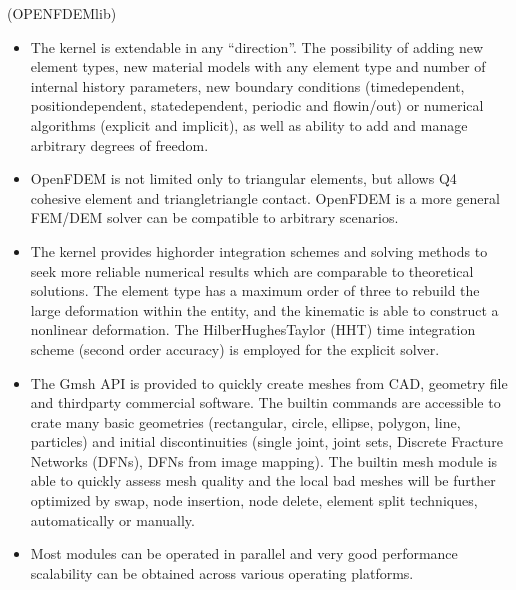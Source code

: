 \documentclass[letterpaper,10pt,english]{sphinxmanual}
\begin{document}
 (OPENFDEMlib)
\begin{itemize}
\item {} 
 \sphinxhyphen{} The kernel is extendable in any “direction”. The possibility of adding new element types, new material models with any element type and number of internal history parameters, new boundary conditions (time\sphinxhyphen{}dependent, position\sphinxhyphen{}dependent, state\sphinxhyphen{}dependent, periodic and flow\sphinxhyphen{}in/out) or numerical algorithms (explicit and implicit), as well as ability to add and manage arbitrary degrees of freedom.

\item {} 
 \sphinxhyphen{} OpenFDEM is not limited only to triangular elements, but allows Q4 cohesive element and triangle\sphinxhyphen{}triangle contact. OpenFDEM is a more general FEM/DEM solver can be compatible to arbitrary scenarios.

\item {} 
 \textendash{} The kernel provides high\sphinxhyphen{}order integration schemes and solving methods to seek more reliable numerical results which are comparable to theoretical solutions. The element type has a maximum order of three to rebuild the large deformation within the entity, and the kinematic is able to construct a nonlinear deformation. The Hilber\sphinxhyphen{}Hughes\sphinxhyphen{}Taylor (HHT) time integration scheme (second order accuracy) is employed for the explicit solver.

\item {} 
 \sphinxhyphen{} The Gmsh API is provided to quickly create meshes from CAD, geometry file and third\sphinxhyphen{}party commercial software. The built\sphinxhyphen{}in commands are accessible to crate many basic geometries (rectangular, circle, ellipse, polygon, line, particles) and initial discontinuities (single joint, joint sets, Discrete Fracture Networks (DFNs), DFNs from image mapping). The built\sphinxhyphen{}in mesh module is able to quickly assess mesh quality and the local bad meshes will be further optimized by swap, node insertion, node delete, element split techniques, automatically or manually.

\item {} 
 \sphinxhyphen{} Most modules can be operated in parallel and very good performance scalability can be obtained across various operating platforms.


\end{itemize}
\end{document}
